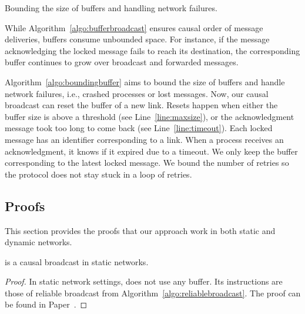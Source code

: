 \begin{algorithm}
  
  \caption{\label{algo:boundingbuffer}Bounding the size of buffers and handling
    network failures.}
\end{algorithm}

While Algorithm~\ref{algo:bufferbroadcast} ensures causal order of message
deliveries, buffers consume unbounded space. For instance, if the message
acknowledging the locked message fails to reach its destination, the
corresponding buffer continues to grow over broadcast and forwarded messages. 

Algorithm~\ref{algo:boundingbuffer} aims to bound the size of buffers and handle
network failures, i.e., crashed processes or lost messages. Now, our causal
broadcast can reset the buffer of a new link. Resets happen when either the
buffer size is above a threshold (see Line~\ref{line:maxsize}), or the
acknowledgment message took too long to come back (see
Line~\ref{line:timeout}). Each locked message has an identifier corresponding to
a link. When a process receives an acknowledgment, it knows if it expired due to
a timeout. We only keep the buffer corresponding to the latest locked
message. We bound the number of retries so the protocol does not stay stuck in a
loop of retries.


%   


\subsection{Proofs}

This section provides the proofs that our approach work in both static and
dynamic networks.

\begin{theorem}
  \CBROADCAST is a causal broadcast in static networks.
\end{theorem}

\begin{proof}
  In static network settings, \CBROADCAST does not use any buffer. Its
  instructions are those of reliable broadcast from
  Algorithm~\ref{algo:reliablebroadcast}. The proof can be found in
  Paper~\cite{friedman2004causal}.
\end{proof}

